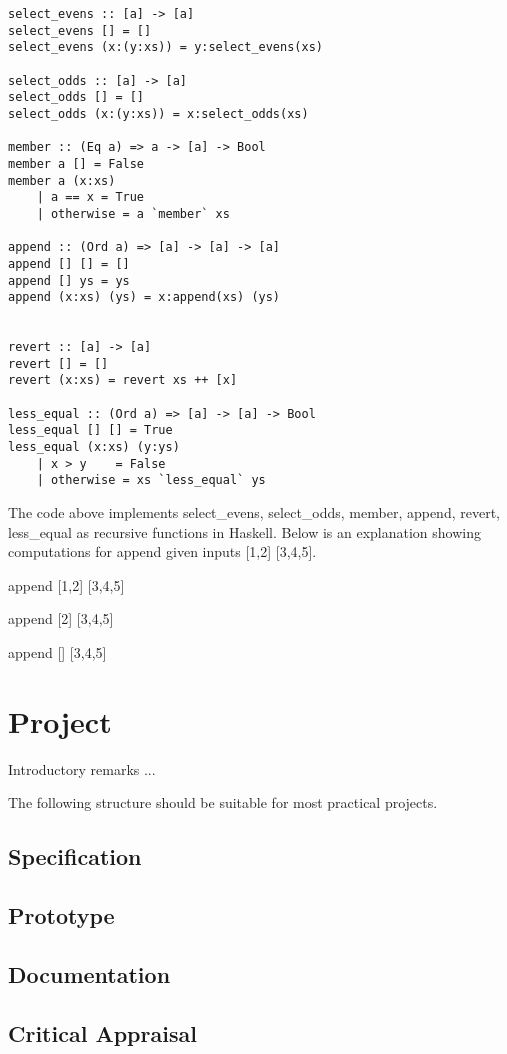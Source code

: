 \documentclass{article}
\theoremstyle{theorem}
\theoremstyle{definition}
\theoremstyle{remark}
\begin{document}
\begin{lstlisting}
select_evens :: [a] -> [a]
select_evens [] = []
select_evens (x:(y:xs)) = y:select_evens(xs)

select_odds :: [a] -> [a]
select_odds [] = []
select_odds (x:(y:xs)) = x:select_odds(xs)

member :: (Eq a) => a -> [a] -> Bool
member a [] = False
member a (x:xs)
    | a == x = True
    | otherwise = a `member` xs

append :: (Ord a) => [a] -> [a] -> [a]
append [] [] = []
append [] ys = ys
append (x:xs) (ys) = x:append(xs) (ys)


revert :: [a] -> [a]
revert [] = []
revert (x:xs) = revert xs ++ [x]

less_equal :: (Ord a) => [a] -> [a] -> Bool
less_equal [] [] = True
less_equal (x:xs) (y:ys)
    | x > y    = False
    | otherwise = xs `less_equal` ys
\end{lstlisting}
%

\noindent The code above implements select\_evens, select\_odds, member, append, revert, less\_equal as recursive functions in Haskell. Below is an explanation showing computations for append given inputs [1,2] [3,4,5].

\medskip\noindent
append [1,2] [3,4,5]

\indent
append [2] [3,4,5]

\indent\indent
append [] [3,4,5]


\section{Project}

Introductory remarks ...

The following structure should be suitable for most practical projects. 

\subsection{Specification}
\subsection{Prototype}
\subsection{Documentation}
\subsection{Critical Appraisal}
\end{document}
